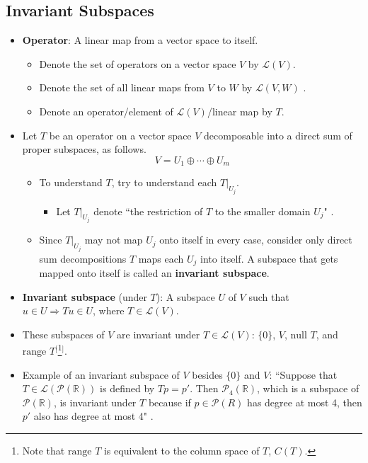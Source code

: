 \documentclass[titlepage]{article}
\numberwithin{figure}{section}
\numberwithin{equation}{section}
\numberwithin{theorem}{section}
\newcommand{\R}{\mathbb{R}}
\newcommand{\dq}[4][]{``#2"#1 \cite[#4]{#3}.}
\newcommand{\Li}{\mathcal{L}}
\begin{document}
\subsection{Invariant Subspaces}
\begin{itemize}
    \item \textbf{Operator}: A linear map from a vector space to itself.
    \begin{itemize}
        \item Denote the set of operators on a vector space $V$ by $\Li(V)$.
        \item Denote the set of all linear maps from $V$ to $W$ by $\Li(V,W)$ \cite[52]{bib:Axler}.
        \item Denote an operator/element of $\Li(V)$/linear map by $T$.
    \end{itemize}
    \item Let $T$ be an operator on a vector space $V$ decomposable into a direct sum of proper subspaces, as follows.
    \begin{equation*}
        V = U_1 \oplus\cdots\oplus U_m
    \end{equation*}
    \begin{itemize}
        \item To understand $T$, try to understand each $T|_{U_j}$.
        \begin{itemize}
            \item Let $T|_{U_j}$ denote \dq{the restriction of $T$ to the smaller domain $U_j$}{bib:Axler}{132}
        \end{itemize}
        \item Since $T|_{U_j}$ may not map $U_j$ onto itself in every case, consider only direct sum decompositions $T$ maps each $U_j$ into itself. A subspace that gets mapped onto itself is called an \textbf{invariant subspace}.
    \end{itemize}
    \item \textbf{Invariant subspace} (under $T$): A subspace $U$ of $V$ such that $u\in U \Rightarrow Tu\in U$, where $T\in\Li(V)$.
    \item These subspaces of $V$ are invariant under $T\in\Li(V)$: $\{0\}$, $V$, $\text{null }T$, and $\text{range }T$$^[$\footnote{Note that $\text{range }T$ is equivalent to the column space of $T$, $C(T)$.}$^]$.
    \item Example of an invariant subspace of $V$ besides $\{0\}$ and $V$: \dq{Suppose that $T\in\Li(\mathcal{P}(\R))$ is defined by $Tp=p'$. Then $\mathcal{P}_4(\R)$, which is a subspace of $\mathcal{P}(\R)$, is invariant under $T$ because if $p\in\mathcal{P}(R)$ has degree at most 4, then $p'$ also has degree at most 4}{bib:Axler}{133}
$$
\end{itemize}
\end{document}
